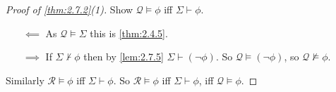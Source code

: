 \documentclass{article}
\newcommand{\rb}[1]{\left( #1 \right)}
\newcommand{\notb}[1]{\rb{\neg #1}}
\theoremstyle{definition}\newtheorem{definition}{Definition}[subsection]
\theoremstyle{definition}\newtheorem{remark}[definition]{Remark}
\theoremstyle{definition}\newtheorem*{example}{Example}
\theoremstyle{definition}\newtheorem*{note}{Note}
\begin{document}
\begin{proof}[Proof of \ref{thm:2.7.2}(1)]
Show $ \mathcal{Q} \vDash \phi $ iff $ \Sigma \vdash \phi $.
\begin{itemize}
\item[$ \impliedby $] As $ \mathcal{Q} \vDash \Sigma $ this is \ref{thm:2.4.5}.
\item[$ \implies $] If $ \Sigma \not\vdash \phi $ then by \ref{lem:2.7.5} $ \Sigma \vdash \notb{\phi} $. So $ \mathcal{Q} \vDash \notb{\phi} $, so $ \mathcal{Q} \not\vDash \phi $.
\end{itemize}
Similarly $ \mathcal{R} \vDash \phi $ iff $ \Sigma \vdash \phi $. So $ \mathcal{R} \vDash \phi $ iff $ \Sigma \vdash \phi $, iff $ \mathcal{Q} \vDash \phi $.
\end{proof}
\end{document}
